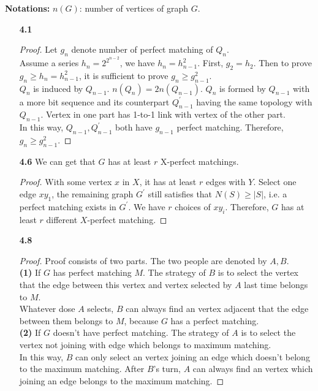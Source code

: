 \documentclass[12pt]{article}
\begin{document}
\pagestyle{fancy}
\textbf{Notations:} $n(G)$: number of vertices of graph $G$.
\begin{enumerate}
\item[\textbf{4.1}] 
\begin{proof}
Let $g_n$ denote number of perfect matching of $Q_n$. \\
Assume a series $h_n = 2^{2^{n-2}}$, we have $h_n = h_{n-1}^2$. First, $g_2 = h_2$. Then to prove $g_n \geq h_n = h_{n-1}^2$, it is sufficient to prove $g_n \geq g_{n-1}^2$. \\
$Q_n$ is induced by $Q_{n-1}$. $n(Q_n) = 2n(Q_{n-1})$. $Q_n$ is formed by $Q_{n-1}$ with a more bit sequence and its counterpart $Q_{n-1}^\prime$ having the same topology with $Q_{n-1}$. Vertex in one part has 1-to-1 link with vertex of the other part. \\
In this way, $Q_{n-1}, Q_{n-1}^\prime$ both have $g_{n-1}$ perfect matching. Therefore, $g_n \geq g_{n-1}^2$. 
\end{proof}
\item[\textbf{4.6}] 
We can get that $G$ has at least $r$ X-perfect matchings. 
\begin{proof}
With some vertex $x$ in $X$, it has at least $r$ edges with $Y$. Select one edge $xy_1$, the remaining graph $G^\prime$ still satisfies that $N(S) \geq |S|$, i.e. a perfect matching exists in $G^\prime$. We have $r$ choices of $xy_i$. Therefore, $G$ has at least $r$ different $X$-perfect matching. 
\end{proof}
\item[\textbf{4.8}] 
\begin{proof}
Proof consists of two parts. The two people are denoted by $A,B$.\\ 
\textbf{(1)} If $G$ has perfect matching $M$. The strategy of $B$ is to select the vertex that the edge between this vertex and vertex selected by $A$ last time belongs to $M$.\\
Whatever dose $A$ selects, $B$ can always find an vertex adjacent that the edge between them belongs to $M$, because $G$ has a perfect matching.\\
\textbf{(2)} If $G$ doesn't have perfect matching. The strategy of $A$ is to select the vertex not joining with edge which belongs to maximum matching.\\
In this way, $B$ can only select an vertex joining an edge which doesn't belong to the maximum matching. After $B$'s turn, $A$ can always find an vertex which joining an edge belongs to the maximum matching.

\end{proof}
\end{enumerate}
\end{document}
